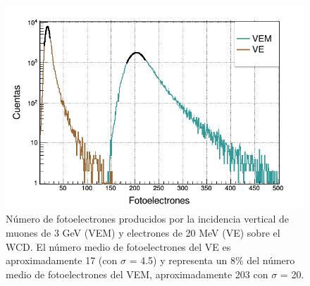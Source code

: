 \documentclass[12pt,oneside,openany,letter]{book}
\begin{document}
\begin{figure}[h]
    \centering
        \includegraphics[scale=0.45]{vem_vee.png}
   \caption[Número de fotoelectrones producidos por la incidencia vertical de muones de 3 GeV (VEM) y electrones de 20 MeV (VE) sobre el WCD]{Número de fotoelectrones producidos por la incidencia vertical de muones de 3 GeV (VEM) y electrones de 20 MeV (VE) sobre el WCD. El número medio de fotoelectrones del VE es aproximadamente 17 (con $\sigma$ = 4.5) y representa un 8\% del número medio de fotoelectrones del VEM, aproximadamente 203 con   $\sigma$ = 20.}\label{vem_vee}
\end{figure}
\end{document}

